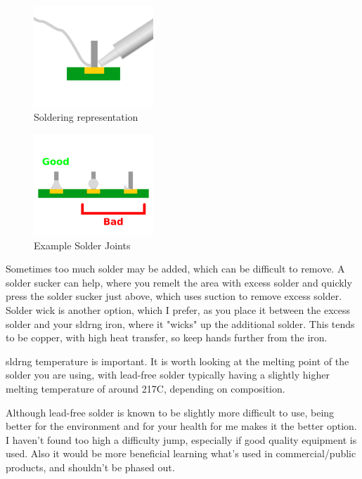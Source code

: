 \documentclass[a4paper,11pt]{report}
\begin{document}
\begin{figure}[H]
\centering
\includegraphics[width=0.4\textwidth]{soldering}
\caption{Soldering representation}
\end{figure}

\begin{figure}[H]
\centering
\includegraphics[width=0.4\textwidth]{solderjoints}
\caption{Example Solder Joints}
\end{figure}

Sometimes too much solder may be added, which can be difficult to remove. A solder sucker can help, where you remelt the area with excess solder and quickly press the solder sucker just above, which uses suction to remove excess solder. Solder wick is another option, which I prefer, as you place it between the excess solder and your \gls{sldrng} iron, where it "wicks" up the additional solder. This tends to be copper, with high heat transfer, so keep hands further from the iron.

\gls{sldrng} temperature is important. It is worth looking at the melting point of the solder you are using, with lead-free solder typically having a slightly higher melting temperature of around 217C, depending on composition.

Although lead-free solder is known to be slightly more difficult to use, being better for the environment and for your health for me makes it the better option. I haven't found too high a difficulty jump, especially if good quality equipment is used. Also it would be more beneficial learning what's used in commercial/public products, and shouldn't be phased out.
\end{document}
